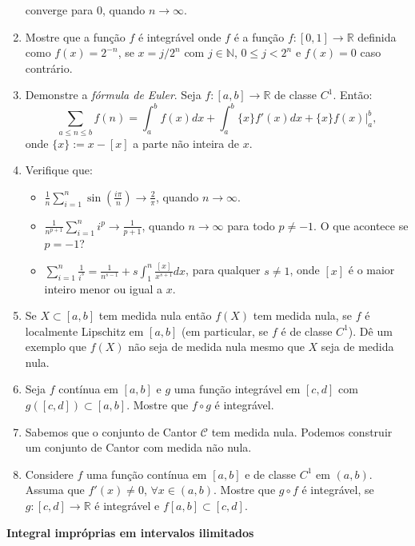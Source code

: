 \documentclass{article}
\theoremstyle{plain}
\theoremstyle{definition}
\theoremstyle{remark}
\begin{document}
\begin{enumerate}
  converge para $0$, quando $n \rightarrow \infty$. 
  \item Mostre que a função $f$ é integrável onde $f$ é a função $f:[0,1]\rightarrow \mathbb{R}$ definida como 
  $f(x)=2^{-n}$, se $x=j/2^{n}$ com 
  $j \in \mathbb{N}$, $0\leq j<2^{n}$ e $f(x)=0$ caso contrário.
  \item Demonstre a {\it fórmula de Euler}. Seja $f:[a,b] \rightarrow \mathbb{R}$ de classe $C^{1}$. Então:
  $$  \sum_{a \leq n \leq b} f(n)=\int_{a}^{b} f(x)dx+\int_{a}^{b} \{x\}f'(x)dx+\{x\}f(x)|_{a}^{b}, $$
  onde $\{x\}:=x-[x]$ a parte não inteira de $x$.
  \item Verifique que:
   \begin{itemize}
   	\item $\frac{1}{n} \sum_{i=1}^{n} \sin(\frac{i\pi}{n}) \rightarrow \frac{2}{\pi}$, 
   	quando $n \rightarrow \infty$.
   	\item $\frac{1}{n^{p+1}} \sum_{i=1}^{n} i^{p} \rightarrow \frac{1}{p+1}$, quando $n \rightarrow \infty$ para todo 
   	$p \neq -1$.
   	O que acontece se $p=-1$?
   	\item $\sum_{i=1}^{n} \frac{1}{i^{s}}=\frac{1}{n^{s-1}}+s \int_{1}^{n}\frac{[x]}{x^{s+1}}dx$, 
   	para qualquer $s\neq1$, onde $[x]$ é o maior inteiro menor ou igual a $x$.
   \end{itemize}
  \item Se $X \subset [a,b]$ tem medida nula então $f(X)$ tem medida nula, se 
  $f$ é localmente Lipschitz em $[a,b]$ (em particular, se $f$ é de classe $C^{1}$).
  Dê um exemplo que $f(X)$ não seja de medida nula mesmo que $X$ seja de medida nula.
  \item Seja $f$ contínua em $[a,b]$ e $g$ uma função integrável em $[c,d]$ com 
  $g([c,d])\subset [a,b]$.
  Mostre que $f \circ g$ é integrável.
  \item Sabemos que o conjunto de Cantor $\mathcal{C}$ tem medida nula. Podemos construir um conjunto de Cantor 
  com medida não nula.  
  \item Considere $f$ uma função contínua em $[a,b]$ e de classe $C^{1}$ em $(a,b)$. 
  Assuma que $f'(x)\neq 0$, $\forall x \in (a,b)$. Mostre que 
  $g \circ f$ é integrável, se $g:[c,d] \rightarrow \mathbb{R}$ é integrável
  e $f[a,b] \subset [c,d]$.  
\end{enumerate}
{\bf Integral impróprias em intervalos ilimitados}
\end{document}

